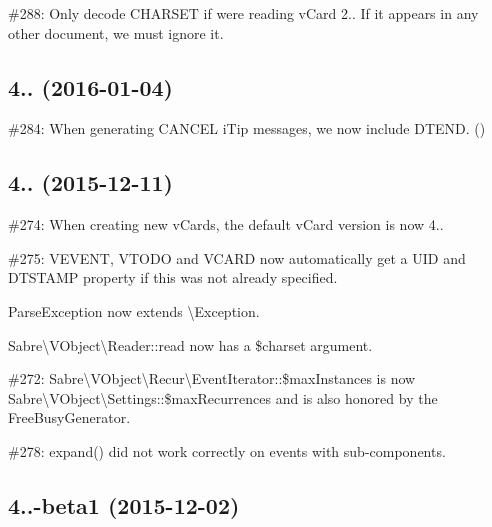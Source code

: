 \begin{DoxyItemize}
\item \#288\+: Only decode {\ttfamily C\+H\+A\+R\+S\+ET} if we\textquotesingle{}re reading v\+Card 2.. If it appears in any other document, we must ignore it.
\end{DoxyItemize}

\subsection*{4.. (2016-\/01-\/04) }


\begin{DoxyItemize}
\item \#284\+: When generating {\ttfamily C\+A\+N\+C\+EL} i\+Tip messages, we now include {\ttfamily D\+T\+E\+ND}. ()
\end{DoxyItemize}

\subsection*{4.. (2015-\/12-\/11) }


\begin{DoxyItemize}
\item \#274\+: When creating new v\+Cards, the default v\+Card version is now 4..
\item \#275\+: {\ttfamily V\+E\+V\+E\+NT}, {\ttfamily V\+T\+O\+DO} and {\ttfamily V\+C\+A\+RD} now automatically get a {\ttfamily U\+ID} and {\ttfamily D\+T\+S\+T\+A\+MP} property if this was not already specified.
\item {\ttfamily Parse\+Exception} now extends {\ttfamily \textbackslash{}Exception}.
\item {\ttfamily Sabre\textbackslash{}V\+Object\textbackslash{}Reader\+::read} now has a {\ttfamily \$charset} argument.
\item \#272\+: {\ttfamily Sabre\textbackslash{}V\+Object\textbackslash{}Recur\textbackslash{}Event\+Iterator\+::\$max\+Instances} is now {\ttfamily Sabre\textbackslash{}V\+Object\textbackslash{}Settings\+::\$max\+Recurrences} and is also honored by the Free\+Busy\+Generator.
\item \#278\+: {\ttfamily expand()} did not work correctly on events with sub-\/components.
\end{DoxyItemize}

\subsection*{4..-\/beta1 (2015-\/12-\/02) }


